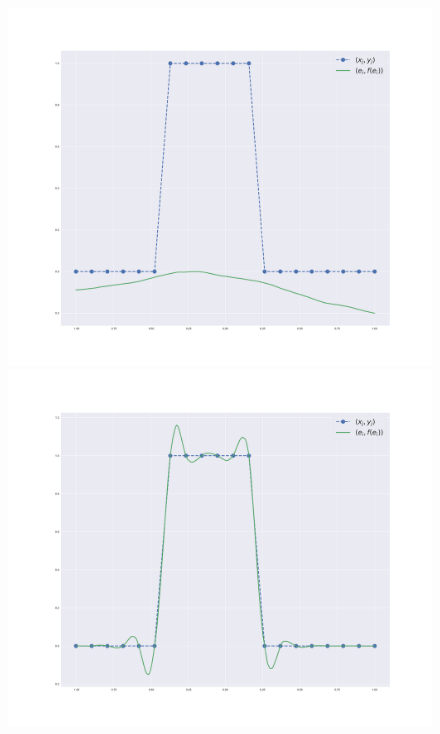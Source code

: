 \begin{figure}\label{fig:different_funcs_same_init}
    \centering
    \includegraphics[width=\linewidth]{figures/same_init_different_func_square_init.pdf}
    \endminipage\hfill
    \includegraphics[width=\linewidth]{figures/same_init_different_func_square_1.pdf}
    \endminipage\hfill

\end{figure}
